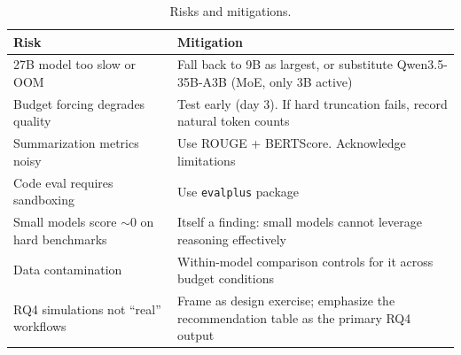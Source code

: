 \documentclass[11pt]{article}
\begin{document}
\begin{table}[h]
\centering
\caption{Risks and mitigations.}
\label{tab:risks}
\begin{tabular}{@{}p{5.5cm}p{8.5cm}@{}}
\toprule
\textbf{Risk} & \textbf{Mitigation} \\
\midrule
27B model too slow or OOM & Fall back to 9B as largest, or substitute Qwen3.5-35B-A3B (MoE, only 3B active) \\
Budget forcing degrades quality & Test early (day 3). If hard truncation fails, record natural token counts \\
Summarization metrics noisy & Use ROUGE + BERTScore. Acknowledge limitations \\
Code eval requires sandboxing & Use \texttt{evalplus} package \\
Small models score $\sim$0 on hard benchmarks & Itself a finding: small models cannot leverage reasoning effectively \\
Data contamination & Within-model comparison controls for it across budget conditions \\
RQ4 simulations not ``real'' workflows & Frame as design exercise; emphasize the recommendation table as the primary RQ4 output \\
\bottomrule
\end{tabular}
\end{table}


\end{document}
